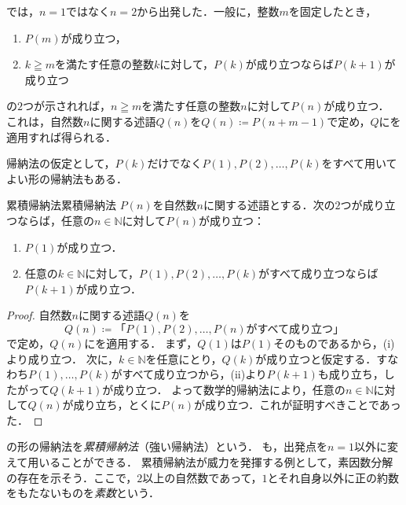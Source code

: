 \begin{remark}[出発点を変えた帰納法]
  では，$n = 1$ではなく$n = 2$から出発した．一般に，整数$m$を固定したとき，
  \begin{enumerate}[label=(\roman*),leftmargin=3.2em]
    \item $P(m)$が成り立つ，
    \item $k \geqq m$を満たす任意の整数$k$に対して，$P(k)$が成り立つならば$P(k+1)$が成り立つ
  \end{enumerate}
  の$2$つが示されれば，$n \geqq m$を満たす任意の整数$n$に対して$P(n)$が成り立つ．
  これは，自然数$n$に関する述語$Q(n)$を$Q(n) \coloneqq P(n + m - 1)$で定め，$Q$にを適用すれば得られる．
\end{remark}

帰納法の仮定として，$P(k)$だけでなく$P(1), P(2), \dots, P(k)$をすべて用いてよい形の帰納法もある．

\begin{prop}{累積帰納法}{累積帰納法}
  $P(n)$を自然数$n$に関する述語とする．次の$2$つが成り立つならば，任意の$n \in \mathbb{N}$に対して$P(n)$が成り立つ：
  \begin{enumerate}[label=(\roman*),leftmargin=3.2em]
    \item $P(1)$が成り立つ．
    \item 任意の$k \in \mathbb{N}$に対して，$P(1), P(2), \dots, P(k)$がすべて成り立つならば$P(k+1)$が成り立つ．
  \end{enumerate}
\end{prop}

\begin{tleftbar}
  \begin{proof}
    自然数$n$に関する述語$Q(n)$を
    \[
      Q(n) \coloneqq \text{「$P(1), P(2), \dots, P(n)$がすべて成り立つ」}
    \]
    で定め，$Q(n)$にを適用する．
    まず，$Q(1)$は$P(1)$そのものであるから，(i)より成り立つ．
    次に，$k \in \mathbb{N}$を任意にとり，$Q(k)$が成り立つと仮定する．すなわち$P(1), \dots, P(k)$がすべて成り立つから，(ii)より$P(k+1)$も成り立ち，したがって$Q(k+1)$が成り立つ．
    よって数学的帰納法により，任意の$n \in \mathbb{N}$に対して$Q(n)$が成り立ち，とくに$P(n)$が成り立つ．これが証明すべきことであった．
  \end{proof}
\end{tleftbar}

の形の帰納法を\emph{累積帰納法}（強い帰納法）という．
も，出発点を$n = 1$以外に変えて用いることができる．
累積帰納法が威力を発揮する例として，素因数分解の存在を示そう．ここで，$2$以上の自然数であって，$1$とそれ自身以外に正の約数をもたないものを\emph{素数}という．

